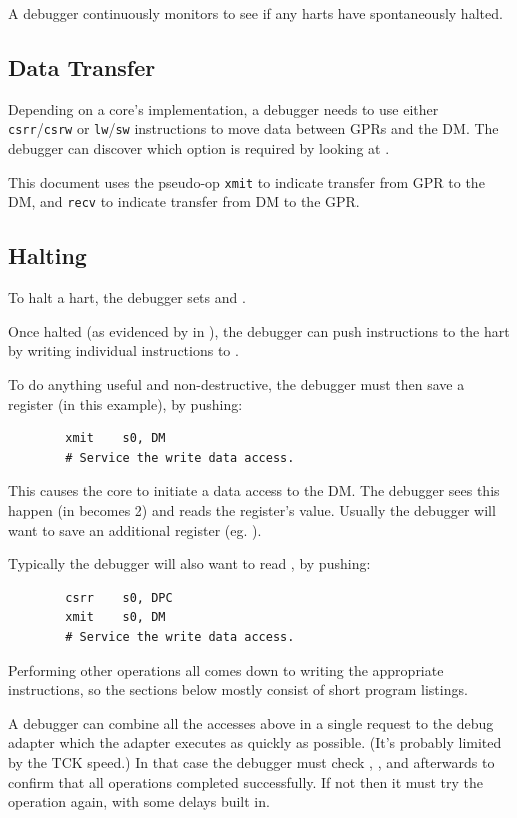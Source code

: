 \documentclass{article}
\begin{document}
A debugger continuously monitors \Rdasum to see if any harts have spontaneously
halted.

\subsection{Data Transfer}

Depending on a core's implementation, a debugger needs to use either {\tt
csrr}/{\tt csrw} or {\tt lw}/{\tt sw} instructions to move data between GPRs
and the DM. The debugger can discover which option is required by looking at
\Rhartinfo.

This document uses the pseudo-op {\tt xmit} to indicate transfer from GPR to
the DM, and {\tt recv} to indicate transfer from DM to the GPR.

\subsection{Halting}

To halt a hart, the debugger sets \Fhartid and \Fhalt.

Once halted (as evidenced by \Faccess in \Raccess), the debugger can push
instructions to the hart by writing individual instructions to \Rifetch.

To do anything useful and non-destructive, the debugger must then save a
register (\Szero in this example), by pushing:
\begin{verbatim}
        xmit    s0, DM
        # Service the write data access.
\end{verbatim}
This causes the core to initiate a data access to the DM. The debugger sees
this happen (\Faccess in \Raccess becomes 2) and reads the register's value.
Usually the debugger will want to save an additional register (eg. \Sone).

Typically the debugger will also want to read \Rpc, by pushing:
\begin{verbatim}
        csrr    s0, DPC
        xmit    s0, DM
        # Service the write data access.
\end{verbatim}

Performing other operations all comes down to writing the appropriate
instructions, so the sections below mostly consist of short program listings.

A debugger can combine all the accesses above in a single request to the debug
adapter which the adapter executes as quickly as possible. (It's probably
limited by the TCK speed.) In that case the debugger must check \Fioverflow,
\Fdunderflow, and \Fdoverflow afterwards to confirm that all operations
completed successfully. If not then it must try the operation again, with some
delays built in.
\end{document}
